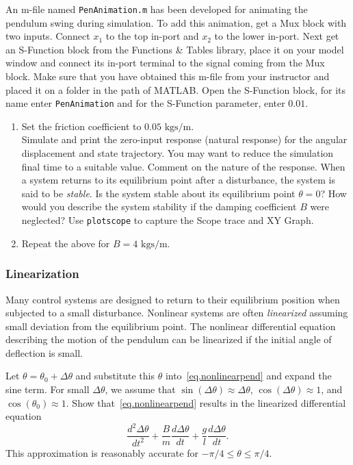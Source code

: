 \par
An m-file named \texttt{PenAnimation.m} has been developed for animating the pendulum swing during simulation.  To add this animation, get a Mux block with two inputs.  Connect $x_1$ to the top in-port and $x_2$ to the lower in-port.  Next get an S-Function block from the Functions \& Tables library, place it on your model window and connect its in-port terminal to the signal coming from the Mux block.  Make sure that you have obtained this m-file from your instructor and placed it on a folder in the path of MATLAB.  Open the S-Function block, for its name enter \texttt{PenAnimation} and for the S-Function parameter, enter $0.01$.

\begin{enumerate}
\item
    Set the friction coefficient to $0.05\mbox{ kgs/m}$.\\
    Simulate and print the zero-input response (natural response) for the angular displacement and state trajectory.  You may want to reduce the simulation final time to a suitable value.  Comment on the nature of the response.  When a system returns to its equilibrium point after a disturbance, the system is said to be \textit{stable}.  Is the system stable about its equilibrium point $\theta=0$?  How would you describe the system stability if the damping coefficient $B$ were neglected?  Use \texttt{plotscope} to capture the Scope trace and XY Graph.
\item
    Repeat the above for $B=4\mbox{ kgs/m}$.
\end{enumerate}

\subsubsection{Linearization}

Many control systems are designed to return to their equilibrium position when subjected to a small disturbance.  Nonlinear systems are often \textit{linearized} assuming small deviation from the equilibrium point.  The nonlinear differential equation describing the motion of the pendulum can be linearized if the initial angle of deflection is small.
\par
Let $\theta = \theta_0+\Delta\theta$ and substitute this $\theta$ into~\eqref{eq.nonlinearpend} and expand the sine term.  For small $\Delta\theta$, we assume that $\sin(\Delta\theta)\approx\Delta\theta$, $\cos(\Delta\theta)\approx 1$, and $\cos(\theta_0)\approx 1$.  Show that~\eqref{eq.nonlinearpend} results in the linearized differential equation
\begin{equation}    \label{eq.linearizedpend}
    \frac{d^2\Delta\theta}{dt^2} + \frac{B}{m}\frac{d\Delta\theta}{dt} + \frac{g}{l}\frac{d\Delta\theta}{dt}.
\end{equation}
This approximation is reasonably accurate for $-\pi/4\leq\theta\leq\pi/4$.

